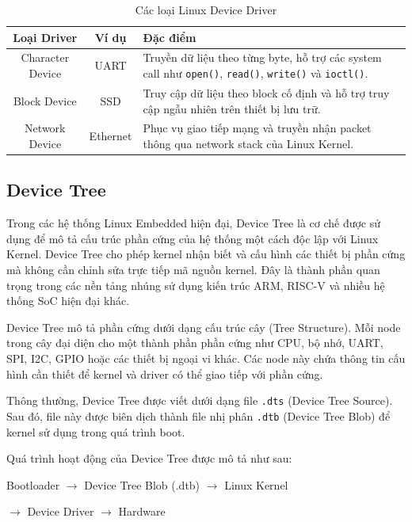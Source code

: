 \begin{table}[H]
\centering

\begin{tabular}{|c|c|p{7cm}|}
\hline
\textbf{Loại Driver} & \textbf{Ví dụ} & \textbf{Đặc điểm} \\ \hline

Character Device &
UART &
Truyền dữ liệu theo từng byte, hỗ trợ các system call như \texttt{open()}, \texttt{read()}, \texttt{write()} và \texttt{ioctl()}. \\ \hline

Block Device &
SSD &
Truy cập dữ liệu theo block cố định và hỗ trợ truy cập ngẫu nhiên trên thiết bị lưu trữ. \\ \hline

Network Device &
Ethernet &
Phục vụ giao tiếp mạng và truyền nhận packet thông qua network stack của Linux Kernel. \\ \hline

\end{tabular}
\caption{Các loại Linux Device Driver}
\label{tab:linux_driver_types}
\end{table}

\subsection{Device Tree}

Trong các hệ thống Linux Embedded hiện đại, Device Tree là cơ chế được sử dụng để mô tả cấu trúc phần cứng của hệ thống một cách độc lập với Linux Kernel. Device Tree cho phép kernel nhận biết và cấu hình các thiết bị phần cứng mà không cần chỉnh sửa trực tiếp mã nguồn kernel. Đây là thành phần quan trọng trong các nền tảng nhúng sử dụng kiến trúc ARM, RISC-V và nhiều hệ thống SoC hiện đại khác. \cite{kernel_device_tree}

Device Tree mô tả phần cứng dưới dạng cấu trúc cây (Tree Structure). Mỗi node trong cây đại diện cho một thành phần phần cứng như CPU, bộ nhớ, UART, SPI, I2C, GPIO hoặc các thiết bị ngoại vi khác. Các node này chứa thông tin cấu hình cần thiết để kernel và driver có thể giao tiếp với phần cứng.

Thông thường, Device Tree được viết dưới dạng file \texttt{.dts} (Device Tree Source). Sau đó, file này được biên dịch thành file nhị phân \texttt{.dtb} (Device Tree Blob) để kernel sử dụng trong quá trình boot.

Quá trình hoạt động của Device Tree được mô tả như sau:

\begin{flushleft}
\small
Bootloader $\rightarrow$ Device Tree Blob (.dtb) $\rightarrow$ Linux Kernel

$\rightarrow$ Device Driver $\rightarrow$ Hardware
\end{flushleft}

